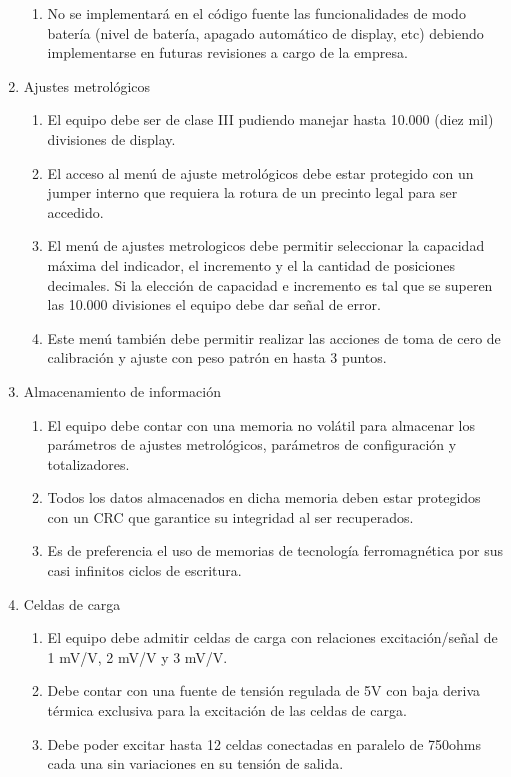 \documentclass[11pt]{charter}
\begin{document}
\begin{enumerate}
\begin{enumerate}
	\item No se implementará en el código fuente las funcionalidades de modo batería (nivel de batería, apagado automático de display, etc) debiendo implementarse en futuras revisiones a cargo de la empresa. 
	\end{enumerate}
\item Ajustes metrológicos
	\begin{enumerate}
	\item El equipo debe ser de clase III pudiendo manejar hasta 10.000 (diez mil) divisiones de display.
	\item El acceso al menú de ajuste metrológicos debe estar protegido con un jumper interno que requiera la rotura de un precinto legal para ser accedido. 
	\item El menú de ajustes metrologicos debe permitir seleccionar la capacidad máxima del indicador, el incremento y el la cantidad de posiciones decimales. Si la elección de capacidad e incremento es tal que se superen las 10.000 divisiones el equipo debe dar señal de error.
	\item Este menú también debe permitir realizar las acciones de toma de cero de calibración y ajuste con peso patrón en hasta 3 puntos.
	\end{enumerate}
\item Almacenamiento de información
	\begin{enumerate}
	\item El equipo debe contar con una memoria no volátil para almacenar los parámetros de ajustes metrológicos, parámetros de configuración y totalizadores. 
	\item Todos los datos almacenados en dicha memoria deben estar protegidos con un CRC que garantice su integridad al ser recuperados.
	\item Es de preferencia el uso de memorias de tecnología ferromagnética por sus casi infinitos ciclos de escritura. 
	\end{enumerate}	
\item Celdas de carga
	\begin{enumerate}
	\item El equipo debe admitir celdas de carga con relaciones excitación/señal de 1 mV/V, 2 mV/V y 3 mV/V.
	\item Debe contar con una fuente de tensión regulada de 5V con baja deriva térmica exclusiva para la excitación de las celdas de carga.
	\item Debe poder excitar hasta 12 celdas conectadas en paralelo de 750ohms cada una sin variaciones en su tensión de salida. 

\end{enumerate}
\end{enumerate}
\end{document}
